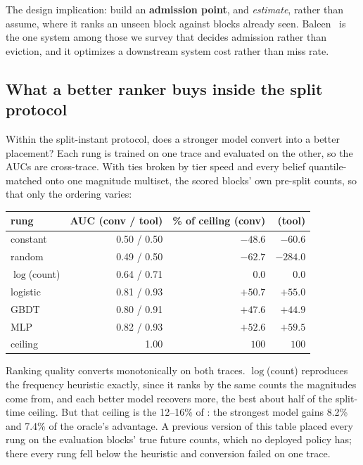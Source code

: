 The design implication: build an \textbf{admission point}, and \emph{estimate}, rather than assume,
where it ranks an unseen block against blocks already seen. Baleen~\cite{S12_wong2024baleen} is the one
system among those we survey that decides admission rather than eviction, and it optimizes a downstream
system cost rather than miss rate.

\subsection{What a better ranker buys inside the split protocol}
\label{sec:capacity}
Within the split-instant protocol, does a stronger model convert into a better placement? Each rung is
trained on one trace and evaluated on the other, so the AUCs are cross-trace. With ties broken by tier
speed and every belief quantile-matched onto one magnitude multiset, the scored blocks' own pre-split
counts, so that only the ordering varies:

\begin{center}\small
\begin{tabular}{@{}lrrr@{}}
\toprule
rung & AUC (conv / tool) & \% of ceiling (conv) & (tool) \\
\midrule
constant        & 0.50 / 0.50 & $-48.6$ & $-60.6$ \\
random          & 0.49 / 0.50 & $-62.7$ & $-284.0$ \\
$\log$(count)   & 0.64 / 0.71 & $0.0$   & $0.0$ \\
logistic        & 0.81 / 0.93 & $+50.7$ & $+55.0$ \\
GBDT            & 0.80 / 0.91 & $+47.6$ & $+44.9$ \\
MLP             & 0.82 / 0.93 & $+52.6$ & $+59.5$ \\
\midrule
ceiling         & 1.00        & $100$   & $100$ \\
\bottomrule
\end{tabular}
\end{center}

\medskip
\noindent Ranking quality converts monotonically on both traces. $\log$(count) reproduces the frequency
heuristic exactly, since it ranks by the same counts the magnitudes come from, and each better model
recovers more, the best about half of the split-time ceiling. But that ceiling is the 12--16\% of
: the strongest model gains 8.2\% and 7.4\% of the oracle's advantage. A previous
version of this table placed every rung on the evaluation blocks' true future counts, which no deployed
policy has; there every rung fell below the heuristic and conversion failed on one trace.

